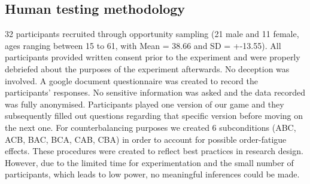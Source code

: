 \subsection{Human testing methodology}

32 participants recruited through opportunity sampling (21 male and 11 female, ages ranging between 15 to 61, with Mean = 38.66 and SD = +-13.55). All participants provided written consent prior to the experiment and were properly debriefed about the purposes of the experiment afterwards. No deception was involved. A google document questionnaire was created to record the participants’ responses. No sensitive information was asked and the data recorded was fully anonymised. Participants played one version of our game and they subsequently filled out questions regarding that specific version before moving on the next one. For counterbalancing purposes we created 6 subconditions (ABC, ACB, BAC, BCA, CAB, CBA) in order to account for possible order-fatigue effects. These procedures were created to reflect best practices in research design. However, due to the limited time for experimentation and the small number of participants, which leads to low power, no meaningful inferences could be made.